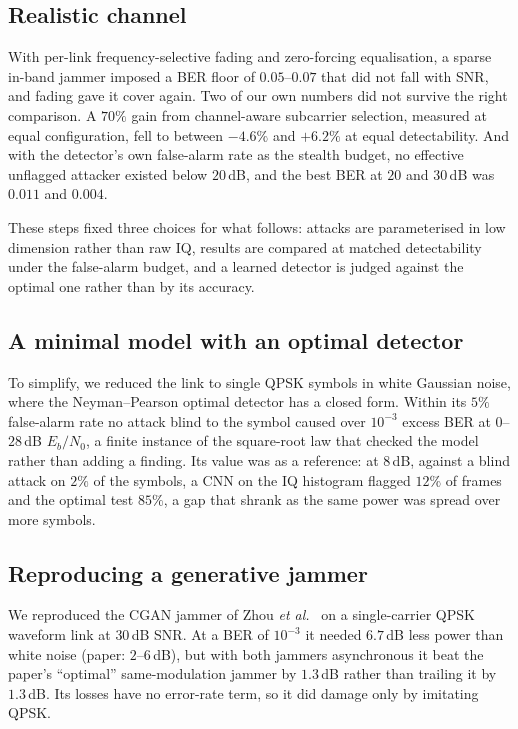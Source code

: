 \documentclass[conference]{IEEEtran}
\begin{document}
\subsection{Realistic channel}
With per-link frequency-selective fading and zero-forcing equalisation, a sparse in-band jammer imposed a BER floor of $0.05$--$0.07$ that did not fall with SNR, and fading gave it cover again.
Two of our own numbers did not survive the right comparison.
A $70\%$ gain from channel-aware subcarrier selection, measured at equal configuration, fell to between $-4.6\%$ and $+6.2\%$ at equal detectability.
And with the detector's own false-alarm rate as the stealth budget, no effective unflagged attacker existed below $20$\,dB, and the best BER at $20$ and $30$\,dB was $0.011$ and $0.004$.

These steps fixed three choices for what follows: attacks are parameterised in low dimension rather than raw IQ, results are compared at matched detectability under the false-alarm budget, and a learned
detector is judged against the optimal one rather than by its accuracy.

\subsection{A minimal model with an optimal detector}
To simplify, we reduced the link to single QPSK symbols in white Gaussian noise, where the Neyman--Pearson optimal detector has a closed form.
Within its $5\%$ false-alarm rate no attack blind to the symbol caused over $10^{-3}$ excess BER at $0$--$28$\,dB $E_b/N_0$, a finite instance of the square-root law that checked the model rather than adding a finding.
Its value was as a reference: at $8$\,dB, against a blind attack on $2\%$ of the symbols, a CNN on the IQ histogram flagged $12\%$ of frames and the optimal test $85\%$, a gap that shrank as the same power was spread over more symbols.

\subsection{Reproducing a generative jammer}
We reproduced the CGAN jammer of Zhou \emph{et al.}~\cite{11184988} on a single-carrier QPSK waveform link at $30$\,dB SNR.
At a BER of $10^{-3}$ it needed $6.7$\,dB less power than white noise (paper: $2$--$6$\,dB), but with both jammers asynchronous it beat the paper's ``optimal'' same-modulation jammer by $1.3$\,dB rather than trailing it by $1.3$\,dB.
Its losses have no error-rate term, so it did damage only by imitating QPSK.
\end{document}
